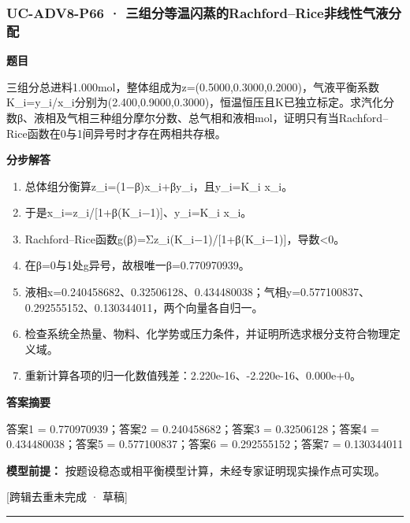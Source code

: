 \documentclass[UTF8,11pt,a4paper]{ctexart}
\begin{document}
\subsubsection*{UC-ADV8-P66 · 三组分等温闪蒸的Rachford–Rice非线性气液分配}
\noindent\textbf{题目}\par
三组分总进料1.000mol，整体组成为z=(0.5000,0.3000,0.2000)，气液平衡系数K\_i=y\_i/x\_i分别为(2.400,0.9000,0.3000)，恒温恒压且K已独立标定。求汽化分数β、液相及气相三种组分摩尔分数、总气相和液相mol，证明只有当Rachford–Rice函数在0与1间异号时才存在两相共存根。\par
\medskip\noindent\textbf{分步解答}
\begin{enumerate}
\item 总体组分衡算z\_i=(1−β)x\_i+βy\_i，且y\_i=K\_i x\_i。
\item 于是x\_i=z\_i/[1+β(K\_i−1)]、y\_i=K\_i x\_i。
\item Rachford–Rice函数g(β)=Σz\_i(K\_i−1)/[1+β(K\_i−1)]，导数<0。
\item 在β=0与1处g异号，故根唯一β=0.770970939。
\item 液相x=0.240458682、0.32506128、0.434480038；气相y=0.577100837、0.292555152、0.130344011，两个向量各自归一。
\item 检查系统全热量、物料、化学势或压力条件，并证明所选求根分支符合物理定义域。
\item 重新计算各项的归一化数值残差：2.220e-16、-2.220e-16、0.000e+0。
\end{enumerate}
\noindent\textbf{答案摘要}\par
答案1 = 0.770970939；答案2 = 0.240458682；答案3 = 0.32506128；答案4 = 0.434480038；答案5 = 0.577100837；答案6 = 0.292555152；答案7 = 0.130344011\par
\noindent\textbf{模型前提：}
按题设稳态或相平衡模型计算，未经专家证明现实操作点可实现。\par
\noindent\textcolor{red!65!black}{[跨辑去重未完成 · 草稿]} \par
\medskip\hrule\medskip
{}
\end{document}
